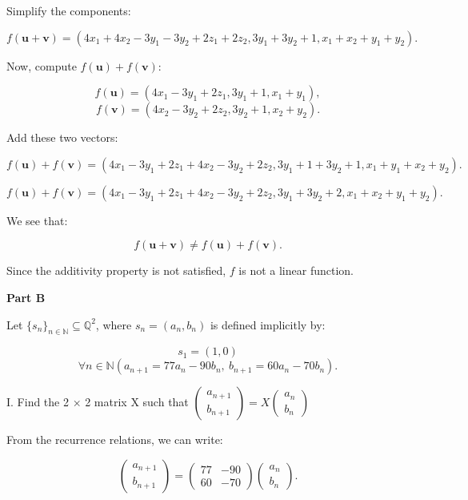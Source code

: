 \documentclass{article}
\begin{document}
	Simplify the components:
	
	\[ f(\mathbf{u} + \mathbf{v}) = (4x_1 + 4x_2 - 3y_1 - 3y_2 + 2z_1 + 2z_2, 3y_1 + 3y_2 + 1, x_1 + x_2 + y_1 + y_2). \]
	
	Now, compute \( f(\mathbf{u}) + f(\mathbf{v}) \):
	
	\[ f(\mathbf{u}) = (4x_1 - 3y_1 + 2z_1, 3y_1 + 1, x_1 + y_1), \]
	\[ f(\mathbf{v}) = (4x_2 - 3y_2 + 2z_2, 3y_2 + 1, x_2 + y_2). \]
	
	Add these two vectors:
	
	\[ f(\mathbf{u}) + f(\mathbf{v}) = (4x_1 - 3y_1 + 2z_1 + 4x_2 - 3y_2 + 2z_2, 3y_1 + 1 + 3y_2 + 1, x_1 + y_1 + x_2 + y_2). \]
	
	\[ f(\mathbf{u}) + f(\mathbf{v}) = (4x_1 - 3y_1 + 2z_1 + 4x_2 - 3y_2 + 2z_2, 3y_1 + 3y_2 + 2, x_1 + x_2 + y_1 + y_2). \]
	
	We see that:
	
	\[ f(\mathbf{u} + \mathbf{v}) \neq f(\mathbf{u}) + f(\mathbf{v}). \]
	
	Since the additivity property is not satisfied, \( f \) is not a linear function.
	
	\textbf{Part B}

	
	Let \( \{ s_n \}_{n \in \mathbb{N}} \subseteq \mathbb{Q}^2 \), where \( s_n = (a_n, b_n) \) is defined implicitly by:
	
	\[ s_1 = (1, 0) \]
	\[ \forall n \in \mathbb{N} \left( a_{n+1} = 77a_n - 90b_n, \ b_{n+1} = 60a_n - 70b_n \right). \]
	
	I. Find the 2 × 2 matrix X such that \( \begin{pmatrix} a_{n+1} \\ b_{n+1} \end{pmatrix} = X \begin{pmatrix} a_n \\ b_n \end{pmatrix} \)
	
	From the recurrence relations, we can write:
	
	\[ \begin{pmatrix} a_{n+1} \\ b_{n+1} \end{pmatrix} = \begin{pmatrix} 77 & -90 \\ 60 & -70 \end{pmatrix} \begin{pmatrix} a_n \\ b_n \end{pmatrix}. \]
	
\end{document}
